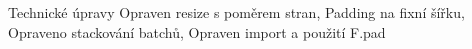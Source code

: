 Technické úpravy
Opraven resize s poměrem stran,
Padding na fixní šířku,
Opraveno stackování batchů,
Opraven import a použití F.pad


